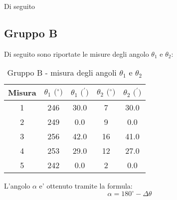 Di seguito

\subsection{Gruppo B}
Di seguito sono riportate le misure degli angolo $\theta_1$ e $\theta_2$:
\begin{table}[!htbp]
    {\par\centering
    \begin{tabular}{ccccc}
        \hline
        Misura & $\theta_1 \text{ ($^{\circ}$)}$ & $\theta_1 \text{ ($^{\prime}$)}$ & $\theta_2 \text{ ($^{\circ}$)}$ & $\theta_2 \text{ ($^{\prime}$)}$ \\
        \hline
        1   &   246 &   30.0    &   7 &   30.0\\
        2   &   249 &   0.0    &   9 &   0.0\\
        3   &   256 &   42.0    &   16 &   41.0\\
        4   &   253 &   29.0    &   12 &   27.0\\
        5   &   242 &   0.0 &   2 &   0.0\\
        \hline
    \end{tabular}
    \par}
    \caption{Gruppo B - misura degli angoli $\theta_1$ e $\theta_2$}
\end{table}

L'angolo $\alpha$ e' ottenuto tramite la formula:
\[
    \alpha = 180^{\circ} - \Delta \theta
\]